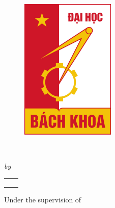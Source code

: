 \thispagestyle{empty}
\begin{center}

\vspace{\baselineskip}
    {\bf \MakeUppercase{\University} \par}
    {\bf \MakeUppercase{\College} \par}
\vspace{\baselineskip}

    {\begin{figure}[!h] 
        \centering
        \includegraphics[width=45mm]{./Images/logo/bkhn} 
    \end{figure}
    }
\
    { \LARGE {\bfseries {\ReportTitle}} \par}
\vspace{\baselineskip}
    {\large \bf \Degree \par} 
\vspace{\baselineskip}



{\textit{by} \par}
\vspace{\baselineskip}
\begin{tabular}{c  c}
    \large {\bf\firstAuthor} & \large {\bf\firstAuthorID} \\
    \large {\bf\secondAuthor} & \large {\bf\secondAuthorID} \\
\large {\bf\thirdAuthor} & \large {\bf\thirdAuthorID}
\end{tabular}


\vspace{\baselineskip}
    {Under the supervision of \par}
\vspace{\baselineskip}
    {{\large \bf \Supervisor} \par}


\vspace{1.5\baselineskip}
    {\bf \MakeUppercase{\reportSubmissionTerm} \par}    
    
 \end{center}